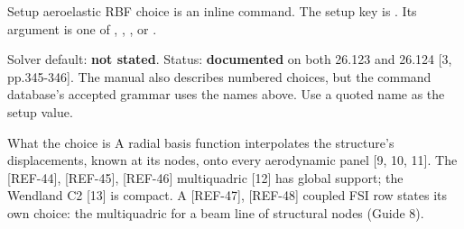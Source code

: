 \begin{frame}{Setup aeroelastic RBF choice}
\small {} is an inline
 command. The setup key is .
Its argument is one of , ,
,  or
.
\par\vspace{1mm}
\small Solver default: \textbf{not stated}. Status: \textbf{documented} on
both 26.123 and 26.124 [3, pp.345-346]. The manual also describes numbered
choices, but the command database's accepted grammar uses the names above.
Use a quoted name as the setup value.
\begin{block}{What the choice is}
\small A radial basis function interpolates the structure's displacements,
known at its nodes, onto every aerodynamic panel [9, 10, 11]. The [REF-44], [REF-45], [REF-46]
multiquadric [12] has global support; the Wendland C2 [13] is compact. A [REF-47], [REF-48]
coupled FSI row states its own choice: the multiquadric for a beam line of
structural nodes (Guide 8).
\end{block}
\end{frame}
